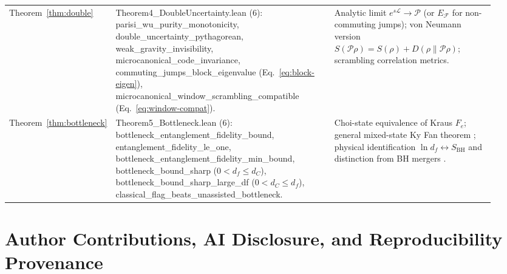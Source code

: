 \documentclass[11pt,a4paper]{article}
\theoremstyle{definition}
\theoremstyle{remark}
\newcommand{\cL}{\mathcal{L}}
\newcommand{\cP}{\mathcal{P}}
\newcommand{\cF}{\mathcal{F}}
\newcommand{\1}{\mathbf{1}}
\newcommand{\code}[1]{{\footnotesize\ttfamily #1}}
\begin{document}
\begin{table}[!tb]
\begin{tabular}{@{}>{\raggedright\arraybackslash}p{0.13\linewidth}>{\raggedright\arraybackslash}p{0.46\linewidth}>{\raggedright\arraybackslash}p{0.34\linewidth}@{}}
Theorem~\ref{thm:double} & \code{Theorem4\_\allowbreak DoubleUncertainty.lean} (6): \code{parisi\_\allowbreak wu\_\allowbreak purity\_\allowbreak monotonicity}, \code{double\_\allowbreak uncertainty\_\allowbreak pythagorean}, \code{weak\_\allowbreak gravity\_\allowbreak invisibility}, \code{microcanonical\_\allowbreak code\_\allowbreak invariance}, \code{commuting\_\allowbreak jumps\_\allowbreak block\_\allowbreak eigenvalue} (Eq.~\eqref{eq:block-eigen}), \code{microcanonical\_\allowbreak window\_\allowbreak scrambling\_\allowbreak compatible} (Eq.~\eqref{eq:window-compat}). & Analytic limit $e^{s\cL}\to\cP$ (or $E_{\cF}$ for non-commuting jumps); von Neumann version $S(\cP\rho)=S(\rho)+D(\rho\|\cP\rho)$; scrambling correlation metrics. \\
Theorem~\ref{thm:bottleneck} & \code{Theorem5\_\allowbreak Bottleneck.lean} (6): \code{bottleneck\_\allowbreak entanglement\_\allowbreak fidelity\_\allowbreak bound}, \code{entanglement\_\allowbreak fidelity\_\allowbreak le\_\allowbreak one}, \code{bottleneck\_\allowbreak entanglement\_\allowbreak fidelity\_\allowbreak min\_\allowbreak bound}, \code{bottleneck\_\allowbreak bound\_\allowbreak sharp} ($0<d_f\le d_C$), \code{bottleneck\_\allowbreak bound\_\allowbreak sharp\_\allowbreak large\_\allowbreak df} ($0<d_C\le d_f$), \code{classical\_\allowbreak flag\_\allowbreak beats\_\allowbreak unassisted\_\allowbreak bottleneck}. & Choi-state equivalence of Kraus $F_e$; general mixed-state Ky Fan theorem \cite{FarberGour2026}; physical identification $\ln d_f \leftrightarrow S_{\mathrm{BH}}$ and distinction from BH mergers \cite{Hawking1971}. \\
\bottomrule
\end{tabular}
\end{table}

\section*{Author Contributions, AI Disclosure, and Reproducibility Provenance}\label{sec:ai-disclosure}
\end{document}
